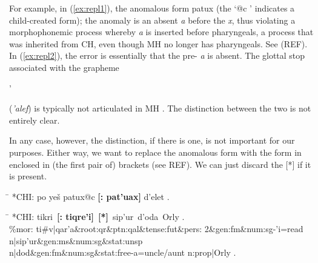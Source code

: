 For example, in (\ref{ex:repl1}), the anomalous 
form \textsf{patux} 
(the `\textsf{@c} ' indicates a child-created form); 
the anomaly is an absent \textit{a} before the \textit{x}, thus violating 
a morphophonemic process 
whereby \textit{a} is inserted before pharyngeals, a process that was inherited 
from CH, even though MH no longer has pharyngeals. See (REF).
In (\ref{ex:repl2}), the error is essentially that the pre-\textit{} 
\textit{a} is absent. The glottal stop
associated with the grapheme \begin{cjhebrew}'\end{cjhebrew} (\textit{'alef}) 
is typically not articulated in MH \citep{montoya:2014}. The distinction
between the two is not entirely clear.

In any case, however, the distinction, if there is one, is not important for our  purposes. 
Either way, we want to replace the anomalous form with the form in enclosed in 
(the first pair of) brackets (see REF). We can just discard the \textsf{[*]} if it is present.

\begin{exe} 
\ex \begin{xlist} 
   \ex\label{ex:repl1} \begin{tabbing}  
	\hspace{0.6in} \= \hspace{5.5in} \kill
	\textsf{*CHI:} \> \textsf{po ye\v{s} patux@c \textbf{[: pat\a'{u}ax]} d\a'{e}let .}
	\end{tabbing}
     \ex\label{ex:repl2} \begin{tabbing}
	\hspace{0.6in} \= \hspace{5.5in} \kill
	\textsf{*CHI:} \> \textsf{tikri \,\textbf{[: tiqre\a'{i}]}\, \textbf{[*]}\, 
	sip\a'{u}r\, d\a'{o}da\, Orly .} \\
	\textsf{\%mor:} \> \textsf{ti\#v|qar\a'{a}\&root:qr\&ptn:qal\&tense:fut\&pers:		2\&gen:fm\&num:sg-\a'{i}=read} \\
                    \> \textsf{n|sip\a'{u}r\&gen:ms\&num:sg\&stat:unsp } \\
                    \> \textsf{n|dod\&gen:fm\&num:sg\&stat:free-a=uncle/aunt} \textsf{n:prop|Orly .}
	\end{tabbing}
   \end{xlist}
\end{exe}

